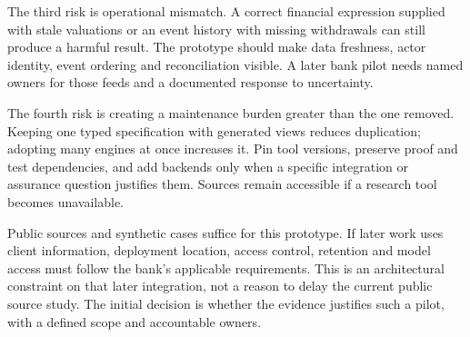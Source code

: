 The third risk is operational mismatch. A correct financial expression supplied
with stale valuations or an event history with missing withdrawals can still
produce a harmful result. The prototype should make data freshness, actor
identity, event ordering and reconciliation visible. A later bank pilot needs
named owners for those feeds and a documented response to uncertainty.

The fourth risk is creating a maintenance burden greater than the one removed.
Keeping one typed specification with generated views reduces duplication;
adopting many engines at once increases it. Pin tool versions, preserve proof and
test dependencies, and add backends only when a specific integration or assurance
question justifies them. Sources remain accessible if a research tool becomes
unavailable.

Public sources and synthetic cases suffice for this prototype. If later work
uses client information, deployment location, access control, retention and model
access must follow the bank's applicable requirements. This is an architectural
constraint on that later integration, not a reason to delay the current public
source study. The initial decision is whether the evidence justifies such a pilot,
with a defined scope and accountable owners.
